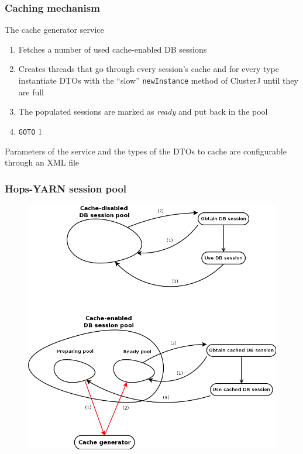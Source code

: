 \documentclass{beamer}
\begin{document}
\begin{frame}
\frametitle{Caching mechanism}

The cache generator service
\begin{enumerate}
\item Fetches a number of used cache-enabled DB sessions

\item Creates threads that go through every session's cache and for
  every type instantiate DTOs with the ``slow''
  \texttt{newInstance} method of ClusterJ until they are full

\item The populated sessions are marked as \emph{ready} and put back
  in the pool

\item \texttt{GOTO} 1
\end{enumerate}

Parameters of the service and the types of the DTOs to cache are
  configurable through an XML file

\end{frame}


\begin{frame}
\frametitle{Hops-YARN session pool}

\begin{figure}
\centering
\includegraphics[scale=0.27]{resources/db_session_pools.png}
\end{figure}
\end{frame}
\end{document}
